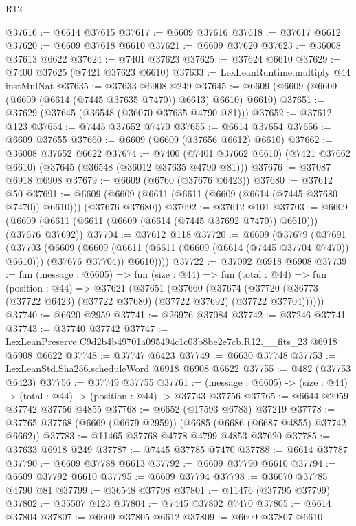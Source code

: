 \begin{lexlean}{R12}
\begin{coremodule}
@37616 := @6614 @37615
@37617 := @6609 @37616
@37618 := @37617 @6612
@37620 := @6609 @37618 @6610
@37621 := @6609 @37620
@37623 := @36008 @37613 @6622
@37624 := @7401 @37623
@37625 := @37624 @6610
@37629 := @7400 @37625 (@7421 @37623 @6610)
@37633 := LexLeanRuntime.multiply @44 instMulNat
@37635 := @37633 @6908 @249
@37645 := @6609 (@6609 (@6609 (@6609 (@6614 (@7445 @37635 @7470)) @6613) @6610) @6610)
@37651 := @37629 (@37645 (@36548 (@36070 @37635 @4790 @81)))
@37652 := @37612 @123
@37654 := @7445 @37652 @7470
@37655 := @6614 @37654
@37656 := @6609 @37655
@37660 := @6609 (@6609 (@37656 @6612) @6610)
@37662 := @36008 @37652 @6622
@37674 := @7400
    (@7401 @37662 @6610)
    (@7421 @37662 @6610)
    (@37645 (@36548 (@36012 @37635 @4790 @81)))
@37676 := @37087 @6918 @6908
@37679 := @6609 (@6760 (@37676 @6423))
@37680 := @37612 @50
@37691 := @6609 (@6609 (@6611 (@6611 (@6609 (@6614 (@7445 @37680 @7470)) @6610))) (@37676 @37680))
@37692 := @37612 @101
@37703 := @6609 (@6609 (@6611 (@6611 (@6609 (@6614 (@7445 @37692 @7470)) @6610))) (@37676 @37692))
@37704 := @37612 @118
@37720 := @6609
    (@37679
      (@37691
        (@37703
          (@6609
            (@6609 (@6611 (@6611 (@6609 (@6614 (@7445 @37704 @7470)) @6610))) (@37676 @37704))
            @6610))))
@37722 := @37092 @6918 @6908
@37739 := fun (message : @6605) =>
  fun (size : @44) =>
  fun (total : @44) =>
  fun (position : @44) =>
  @37621
    (@37651
      (@37660
        (@37674 (@37720 (@36773 (@37722 @6423) (@37722 @37680) (@37722 @37692) (@37722 @37704))))))
@37740 := @6620 @2959
@37741 := @26976 @37084
@37742 := @37246 @37741
@37743 := @37740 @37742
@37747 := LexLeanPreserve.C9d2b4b49701a095494c1c03b8be2e7cb.R12.__fits_23 @6918 @6908 @6622
@37748 := @37747 @6423
@37749 := @6630 @37748
@37753 := LexLeanStd.Sha256.scheduleWord @6918 @6908 @6622
@37755 := @482 (@37753 @6423)
@37756 := @37749 @37755
@37761 := (message : @6605) -> (size : @44) -> (total : @44) -> (position : @44) -> @37743 @37756
@37765 := @6644 @2959 @37742 @37756 @4855
@37768 := @6652 (@17593 @6783) @37219
@37778 := @37765 @37768 (@6669 (@6679 @2959)) (@6685 (@6686 (@6687 @4855) @37742 @6662))
@37783 := @11465 @37768 @4778 @4799 @4853 @37620
@37785 := @37633 @6918 @249
@37787 := @7445 @37785 @7470
@37788 := @6614 @37787
@37790 := @6609 @37788 @6613
@37792 := @6609 @37790 @6610
@37794 := @6609 @37792 @6610
@37795 := @6609 @37794
@37798 := @36070 @37785 @4790 @81
@37799 := @36548 @37798
@37801 := @11476 (@37795 @37799)
@37802 := @35507 @123
@37804 := @7445 @37802 @7470
@37805 := @6614 @37804
@37807 := @6609 @37805 @6612
@37809 := @6609 @37807 @6610

\end{coremodule}
\end{lexlean}
